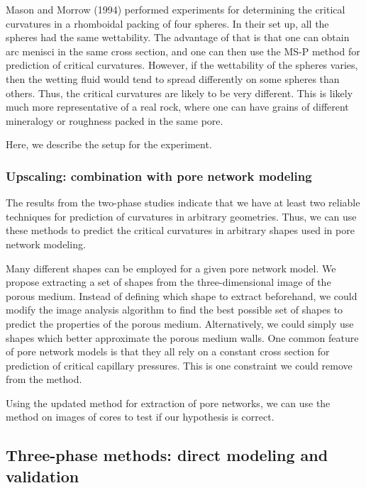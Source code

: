 Mason and Morrow (1994) performed experiments for determining the critical curvatures in a rhomboidal packing of four spheres. In their set up, all the spheres had the same wettability. The advantage of that is that one can obtain arc menisci in the same cross section, and one can then use the MS-P method for prediction of critical curvatures. However, if the wettability of the spheres varies, then the wetting fluid would tend to spread differently on some spheres than others. Thus, the critical curvatures are likely to be very different. This is likely much more representative of a real rock, where one can have grains of different mineralogy or roughness packed in the same pore. 

Here, we describe the setup for the experiment.

\subsubsection{Upscaling: combination with pore network modeling}

The results from the two-phase studies indicate that we have at least two reliable techniques for prediction of curvatures in arbitrary geometries. Thus, we can use these methods to predict the critical curvatures in arbitrary shapes used in pore network modeling.

Many different shapes can be employed for a given pore network model. We propose extracting a set of shapes from the three-dimensional image of the porous medium. Instead of defining which shape to extract beforehand, we could modify the image analysis algorithm to find the best possible set of shapes to predict the properties of the porous medium. Alternatively, we could simply use shapes which better approximate the porous medium walls. One common feature of pore network models is that they all rely on a constant cross section for prediction of critical capillary pressures. This is one constraint we could remove from the method.

Using the updated method for extraction of pore networks, we can use the method on images of cores to test if our hypothesis is correct.

\subsection{Three-phase methods: direct modeling and validation}



